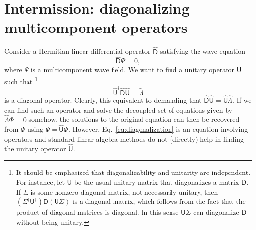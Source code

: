 \section{Intermission: diagonalizing multicomponent operators}

Consider a Hermitian linear differential operator $\hat{\mathsf{D}}$ satisfying the wave equation
%
\begin{equation}
  \hat{\mathsf{D}}\Psi = 0,
\end{equation}
%
where $\Psi$ is a multicomponent wave field.
%
We want to find a unitary operator ${\mathsf{U}}$ such that%
\footnote{It should be emphasized that diagonalizability and unitarity are independent. For instance, let $\mathsf{U}$ be the usual unitary matrix that diagonalizes a matrix $\mathsf{D}$.
  If $\Sigma$ is some nonzero diagonal matrix, not necessarily unitary, then $(\Sigma^{\dagger}\mathsf{U}^{\dagger})\mathsf{D}(\mathsf{U}\Sigma)$ is a diagonal matrix, which follows from the fact that the product of diagonal matrices is diagonal.
  In this sense $\mathsf{U}\Sigma$ can diagonalize $\mathsf{D}$ without being unitary.}
%
\begin{equation}
  \hat{\mathsf{U}}^{\dagger}\hat{\mathsf{D}}\hat{\mathsf{U}} = \hat{\Lambda}\label{eq:diagonalization}
\end{equation}
%
is a diagonal operator.
Clearly, this equivalent to demanding that $\hat{\mathsf{D}}\hat{\mathsf{U}} = \hat{\mathsf{U}}\hat{\Lambda}$.
If we can find such an operator and solve the decoupled set of equations given by $\hat{\Lambda}\Phi = 0$ somehow,
the solutions to the original equation can then be recovered from $\Phi$ using $\Psi = \hat{\mathsf{U}}\Phi$.
However, Eq.~\eqref{eq:diagonalization} is an equation involving operators and standard linear algebra methods do not (directly) help in finding the unitary operator $\hat{\mathsf{U}}$.

